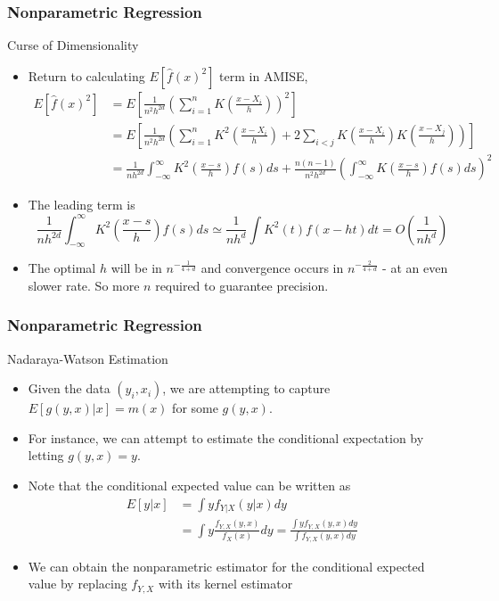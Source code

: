 \documentclass{beamer}
\begin{document}
\begin{frame}
\frametitle{Nonparametric Regression}
Curse of Dimensionality
\begin{itemize}
\item Return to calculating $E[\hat{f}(x)^2]$ term in AMISE, 
 \footnotesize{\begin{align*}
 E[\hat{f}(x)^2]&=E\left[\frac{1}{n^2h^{2d}}\left(\sum_{i=1}^nK\left(\frac{x-X_i}{h}\right)\right)^2\right]\\
 &=E\left[\frac{1}{n^2h^{2d}}\left(\sum_{i=1}^nK^2\left(\frac{x-X_i}{h}\right)+2\sum_{i<j} K\left(\frac{x-X_i}{h}\right)K\left(\frac{x-X_j}{h}\right)\right)\right]\\
 &=\frac{1}{nh^{2d}}\int_{-\infty}^\infty K^2\left(\frac{x-s}{h}\right)f(s)ds+\frac{n(n-1)}{n^2h^{2d}}\left(\int_{-\infty}^\infty K\left(\frac{x-s}{h}\right)f(s)ds\right)^2
 \end{align*}}\normalsize
 \item The leading term is
\footnotesize{ \[
\frac{1}{nh^{2d}}\int_{-\infty}^\infty K^2\left(\frac{x-s}{h}\right)f(s)ds \simeq \frac{1}{nh^d}\int K^2(t)f(x-ht)dt = O\left(\frac{1}{nh^d}\right)
 \]}\normalsize
\item The optimal $h$ will be in $n^{-\frac{1}{4+d}}$ and convergence occurs in $n^{-\frac{2}{4+d}}$ - at an even slower rate. So more $n$ required to guarantee precision. 
\end{itemize}
\end{frame}

\begin{frame}
\frametitle{Nonparametric Regression}
Nadaraya-Watson Estimation
\begin{itemize}
\item Given the data $(y_i,x_i)$, we are attempting to capture $E[g(y,x)|x]=m(x)$ for some $g(y,x)$. 
\item For instance, we can attempt to estimate the conditional expectation by letting $g(y,x)=y$. 
\item Note that the conditional expected value can be written as
 \begin{align*}
 E[y|x]&=\int y f_{Y|X}(y|x)dy \\
 &=\int y \frac{f_{Y,X}(y,x)}{f_{X}(x)}dy=\frac{\int yf_{Y,X}(y,x)dy}{\int f_{Y,X}(y,x)dy}
 \end{align*}
\item  We can obtain the nonparametric estimator for the conditional expected value by replacing $f_{Y,X}$ with its kernel estimator
\end{itemize}
\end{frame}
\end{document}
